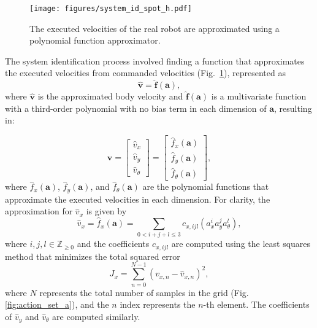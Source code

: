 \begin{figure}%
\centering\texttt{[image: figures/system\_id\_spot\_h.pdf]}
    \caption{The executed velocities of the real robot are approximated using a polynomial function approximator.}
    \label{fig:fuction_approximation}
\end{figure}

The system identification process involved finding a function that approximates the executed velocities from commanded velocities (Fig.~\ref{fig:fuction_approximation}), represented as
\begin{equation}
    \hat{\mathbf{v}} = \hat{\mathbf{f}}(\mathbf{a}),
\end{equation}
where  $\hat{\mathbf{v}}$ is the approximated body velocity and $\hat{\mathbf{f}}(\mathbf{a})$ is a multivariate function with a third-order polynomial with no bias term in each dimension of $\mathbf{a}$, resulting in:

\begin{equation}
    \hat{\mathbf{v}} = \begin{bmatrix}
           \hat{v}_x \\
           \hat{v}_y \\
           \hat{v}_{\theta}
         \end{bmatrix}
     =
     \begin{bmatrix}
         \hat{f}_x(\mathbf{a})\\
         \hat{f}_y(\mathbf{a})\\
         \hat{f}_\theta(\mathbf{a})
     \end{bmatrix},
\end{equation}
where $\hat{f}_x(\mathbf{a})$, $\hat{f}_y(\mathbf{a})$, and $  \hat{f}_\theta(\mathbf{a})$ are the polynomial functions that approximate the executed velocities in each dimension. For clarity, the approximation for $\hat{v}_x$ is given by
\begin{equation}
    \hat{v}_x = \hat{f}_x(\mathbf{a}) = \sum_{0 < i+j+l \leq 3} c_{x,ijl} (a^i_x a^j_y a^l_\theta),
\end{equation}
 where $i, j, l \in \mathbb{Z}_{\geq 0}$ and the coefficients $c_{x,ijl}$ are computed using the least squares method that minimizes the total squared error
\begin{equation}
    J_x = \sum_{n=0}^{N-1} (v_{x,n} - \hat{v}_{x,n})^2,
\end{equation}
where $N$ represents the total number of samples in the grid (Fig. \ref{fig:action_set_a}), and the $n$ index represents the $n$-th element. The coefficients of $\hat{v}_y$ and $\hat{v}_{\theta}$ are computed similarly. 

